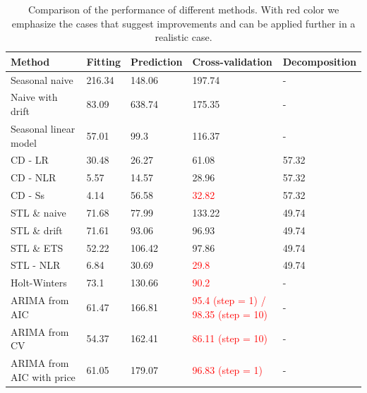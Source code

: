 \documentclass[12pt, letterpaper]{article}\usepackage[]{graphicx}\usepackage[]{color}
\begin{document}
\begin{table}[h!]
\begin{tabular}{ | m{3cm} | m{1.8cm}| m{1.8cm} | m{3cm} |m{2.5cm} |} 
\hline\vspace{0.1cm}
Method & Fitting & Prediction & Cross-validation & Decomposition\\ 
\hline\hline\vspace{0.1cm}
Seasonal naive & 216.34 & 148.06 & 197.74 & - \\
\hline\vspace{0.1cm}
Naive with drift & 83.09 & 638.74 & 175.35 & - \\
\hline\vspace{0.1cm}
Seasonal linear model & 57.01 & 99.3 & 116.37 &- \\ 
\hline\vspace{0.1cm}
CD - LR & 30.48 &  26.27 & 61.08 & 57.32\\ 
\hline\vspace{0.1cm}
CD - NLR & 5.57 & 14.57 & 28.96 & 57.32 \\
\hline\vspace{0.1cm}
CD - Ss & 4.14 & 56.58 & \textcolor{red}{32.82} & 57.32 \\
\hline\vspace{0.1cm}
STL \& naive & 71.68 & 77.99 & 133.22 & 49.74\\
\hline\vspace{0.1cm}
STL \& drift & 71.61 & 93.06 & 96.93 & 49.74\\
\hline\vspace{0.1cm}
STL \& ETS & 52.22 & 106.42 & 97.86 & 49.74\\
\hline\vspace{0.1cm}
STL - NLR & 6.84 & 30.69 & \textcolor{red}{29.8} & 49.74\\
\hline\vspace{0.1cm}
Holt-Winters & 73.1 & 130.66 & \textcolor{red}{90.2} & - \\
\hline\vspace{0.1cm}
ARIMA from AIC & 61.47 & 166.81 & \textcolor{red}{95.4 (step = 1) / 98.35 (step = 10)}& - \\
\hline\vspace{0.1cm}
ARIMA from CV &  54.37 & 162.41 & \textcolor{red}{86.11 (step = 10)} & - \\
\hline\vspace{0.1cm}
ARIMA from AIC with price & 61.05 & 179.07 & \textcolor{red}{96.83 (step = 1)}& - \\
\hline
\end{tabular}
\caption{Comparison of the performance of different methods. With red color we emphasize the cases that suggest improvements and can be applied further in a realistic case.}
\label{tab:Comparison}
\end{table}
\end{document}
